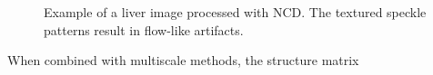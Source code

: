 \begin{figure}[H]
{  }
  \caption{Example of a liver image processed with NCD.
    The textured speckle patterns result in flow-like artifacts.}\label{fig:ncd_liver}
\end{figure}


When combined with multiscale methods, the structure matrix 



